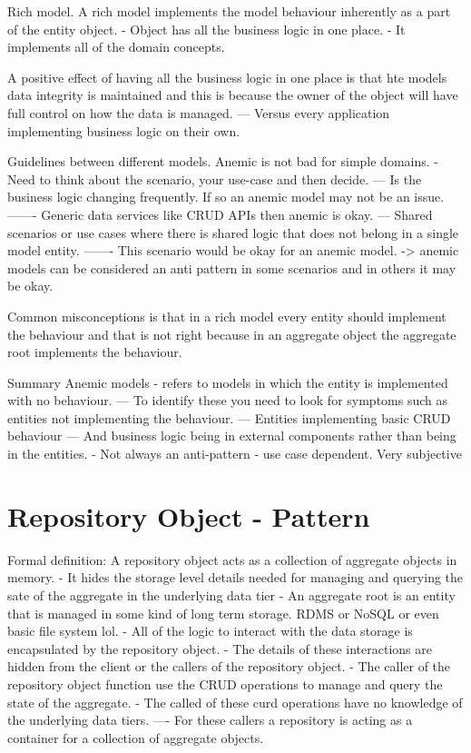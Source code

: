 Rich model.
A rich model implements the model behaviour inherently as a part of the entity object.
- Object has all the business logic in one place.
- It implements all of the domain concepts.

A positive effect of having all the business logic in one place is that hte models data integrity is maintained and this is because the owner of the object will have full control on how the data is managed.
--- Versus every application implementing business logic on their own.

Guidelines between different models.
Anemic is not bad for simple domains.
- Need to think about the scenario, your use-case and then decide.
--- Is the business logic changing frequently. If so an anemic model may not be an issue.
------- Generic data services like CRUD APIs then anemic is okay.
--- Shared scenarios or use cases where there is shared logic that does not belong in a single model entity.
------- This scenario would be okay for an anemic model.
-> anemic models can be considered an anti pattern in some scenarios and in others it may be okay.

Common misconceptions is that in a rich model every entity should implement the behaviour and that is not right because in an aggregate object the aggregate root implements the behaviour.

Summary
Anemic models - refers to models in which the entity is implemented with no behaviour.
--- To identify these you need to look for symptoms such as entities not implementing the behaviour.
--- Entities implementing basic CRUD behaviour
--- And business logic being in external components rather than being in the entities.
- Not always an anti-pattern - use case dependent. Very subjective

\section{Repository Object - Pattern}

Formal definition: A repository object acts as a collection of aggregate objects in memory.
- It hides the storage level details needed for managing and querying the sate of the aggregate in the underlying data tier
- An aggregate root is an entity that is managed in some kind of long term storage. RDMS or NoSQL or even basic file system lol.
- All of the logic to interact with the data storage is encapsulated by the repository object.
- The details of these interactions are hidden from the client or the callers of the repository object.
- The caller of the repository object function use the CRUD operations to manage and query the state of the aggregate.
- The called of these curd operations have no knowledge of the underlying data tiers.
---- For these callers a repository is acting as a container for a collection of aggregate objects.

